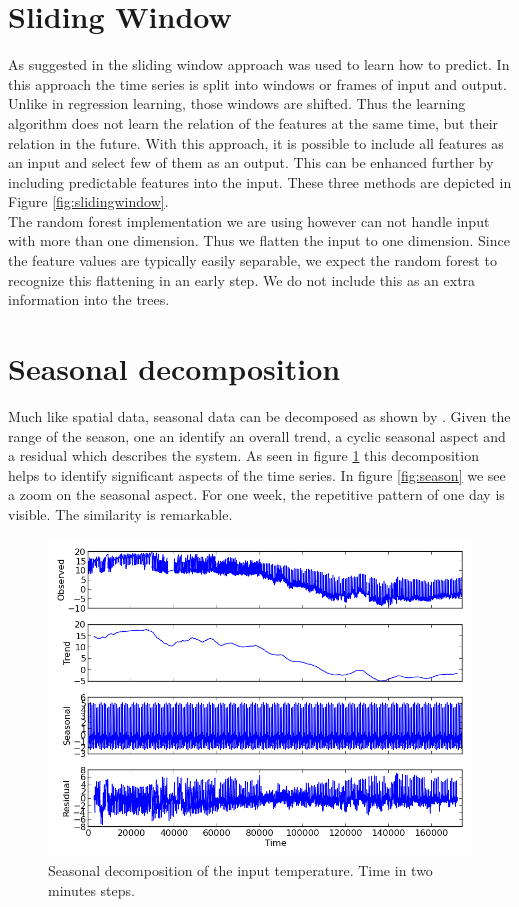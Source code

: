 \documentclass{scrartcl}
\begin{document}
\section{Sliding Window}
\label{sec:slidingwindow}
As suggested in \cite{vafaeipour2014application} the sliding window approach was used to learn how to predict. In this approach the time series is split into windows or frames of input and output. Unlike in regression learning, those windows are shifted. Thus the learning algorithm does not learn the relation of the features at the same time, but their relation in the future. With this approach, it is possible to include all features as an input and select few of them as an output. This can be enhanced further by including predictable features into the input. These three methods are depicted in Figure \ref{fig:slidingwindow}.\\
The random forest implementation we are using however can not handle input with more than one dimension. Thus we flatten the input to one dimension. Since the feature values are typically easily separable, we expect the random forest to recognize this flattening in an early step. We do not include this as an extra information into the trees.


\section{Seasonal decomposition}
\label{sec:season}
Much like spatial data, seasonal data can be decomposed as shown by \cite{loess}. Given the range of the season, one an identify an overall trend, a cyclic seasonal aspect and a residual which describes the system. As seen in figure \ref{fig:decomp} this decomposition helps to identify significant aspects of the time series. In figure \ref{fig:season} we see a zoom on the seasonal aspect. For one week, the repetitive pattern of one day is visible. The similarity is remarkable.


\begin{figure}[H]
  \centering
  \includegraphics[width=0.5\linewidth]{img/seasondecomposition-input-temperature.png}
  \caption{Seasonal decomposition of the input temperature. Time in two minutes steps.}
  \label{fig:decomp}
\end{figure}
\end{document}

